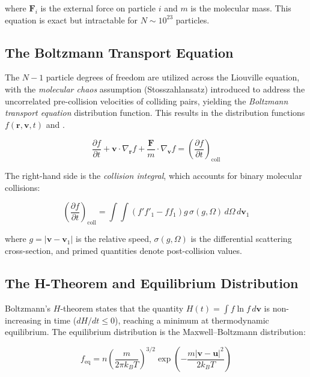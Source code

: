 \noindent where $\mathbf{F}_i$ is the external force on particle $i$ and $m$ is the molecular mass. This equation is exact but intractable for $N \sim 10^{23}$ particles.

\subsection{The Boltzmann Transport Equation}

The $N-1$ particle degrees of freedom are utilized across the Liouville equation, with the \textit{molecular chaos} assumption (Stosszahlansatz) introduced to address the uncorrelated pre-collision velocities of colliding pairs, yielding the \textit{Boltzmann transport equation} distribution function. This results in the distribution functions $f(\mathbf{r}, \mathbf{v}, t)$ and \cite{bird1994molecular}.

\begin{equation}
    \frac{\partial f}{\partial t} + \mathbf{v} \cdot \nabla_{\mathbf{r}} f + \frac{\mathbf{F}}{m} \cdot \nabla_{\mathbf{v}} f = \left( \frac{\partial f}{\partial t} \right)_{\text{coll}}
    \label{eq:boltzmann}
\end{equation}

\noindent The right-hand side is the \textit{collision integral}, which accounts for binary molecular collisions:

\begin{equation}
    \left( \frac{\partial f}{\partial t} \right)_{\text{coll}} = \int \int \left( f' f'_1 - f f_1 \right) g \, \sigma(g, \Omega) \, d\Omega \, d\mathbf{v}_1
    \label{eq:collision_integral}
\end{equation}

\noindent where $g = |\mathbf{v} - \mathbf{v}_1|$ is the relative speed, $\sigma(g, \Omega)$ is the differential scattering cross-section, and primed quantities denote post-collision values.

\subsection{The H-Theorem and Equilibrium Distribution}

Boltzmann's $H$-theorem states that the quantity $H(t) = \int f \ln f \, d\mathbf{v}$ is non-increasing in time ($dH/dt \leq 0$), reaching a minimum at thermodynamic equilibrium. The equilibrium distribution is the Maxwell--Boltzmann distribution:

\begin{equation}
    f_{\text{eq}} = n \left( \frac{m}{2\pi k_B T} \right)^{3/2} \exp\left( -\frac{m|\mathbf{v} - \mathbf{u}|^2}{2 k_B T} \right)
    \label{eq:maxwell_boltzmann}
\end{equation}

